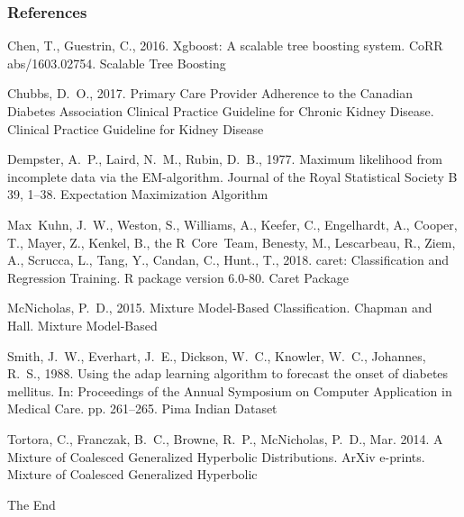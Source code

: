 \documentclass{beamer}
\begin{document}
\begin{frame}
\frametitle{References}
\footnotesize{
\begin{thebibliography}{99} %
\begin{tiny}

Chen, T., Guestrin, C., 2016. Xgboost: {A} scalable tree boosting system. CoRR
  abs/1603.02754.
\newblock Scalable Tree Boosting

Chubbs, D.~O., 2017. Primary Care Provider Adherence to the Canadian Diabetes
  Association Clinical Practice Guideline for Chronic Kidney Disease.
\newblock Clinical Practice Guideline for Kidney Disease


Dempster, A.~P., Laird, N.~M., Rubin, D.~B., 1977. Maximum likelihood from
  incomplete data via the {EM}-algorithm. Journal of the Royal Statistical
  Society B 39, 1--38.
  \newblock Expectation Maximization Algorithm


Max~Kuhn, J.~W., Weston, S., Williams, A., Keefer, C., Engelhardt, A., Cooper,
  T., Mayer, Z., Kenkel, B., the R~Core~Team, Benesty, M., Lescarbeau, R.,
  Ziem, A., Scrucca, L., Tang, Y., Candan, C., Hunt., T., 2018. caret:
  Classification and Regression Training. R package version 6.0-80.
\newblock Caret Package

McNicholas, P.~D., 2015. Mixture Model-Based Classification. Chapman and Hall.
\newblock Mixture Model-Based


Smith, J.~W., Everhart, J.~E., Dickson, W.~C., Knowler, W.~C., Johannes, R.~S.,
  1988. Using the adap learning algorithm to forecast the onset of diabetes
  mellitus. In: Proceedings of the Annual Symposium on Computer Application in
  Medical Care. pp. 261--265.
  \newblock Pima Indian Dataset 

{Tortora}, C., {Franczak}, B.~C., {Browne}, R.~P., {McNicholas}, P.~D., Mar.
  2014. {A Mixture of Coalesced Generalized Hyperbolic Distributions}. ArXiv
  e-prints.
  \newblock Mixture of Coalesced Generalized Hyperbolic


\end{tiny}

\end{thebibliography}
}
\end{frame}


\begin{frame}
\Huge{\centerline{The End}}
\end{frame}

\end{document}
